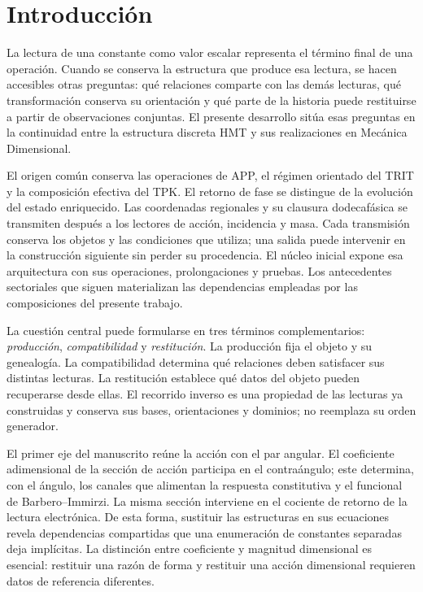 \section{Introducción}

\label{md:introduccion}
La lectura de una constante como valor escalar representa el término final
de una operación. Cuando se conserva la estructura que produce esa lectura,
se hacen accesibles otras preguntas: qué relaciones comparte con las demás
lecturas, qué transformación conserva su orientación y qué parte de la
historia puede restituirse a partir de observaciones conjuntas. El presente
desarrollo sitúa esas preguntas en la continuidad entre la estructura discreta
HMT y sus realizaciones en Mecánica Dimensional.

El origen común conserva las operaciones de APP, el régimen orientado del
TRIT y la composición efectiva del TPK. El retorno de fase se distingue de
la evolución del estado enriquecido. Las coordenadas regionales y su
clausura dodecafásica se transmiten después a los lectores de acción,
incidencia y masa. Cada transmisión conserva los objetos y las condiciones
que utiliza; una salida puede intervenir en la construcción siguiente sin
perder su procedencia. El núcleo inicial expone esa arquitectura con sus
operaciones, prolongaciones y pruebas. Los antecedentes sectoriales que
siguen materializan las dependencias empleadas por las composiciones del
presente trabajo.

La cuestión central puede formularse en tres términos complementarios:
\emph{producción}, \emph{compatibilidad} y \emph{restitución}. La
producción fija el objeto y su genealogía. La compatibilidad determina qué
relaciones deben satisfacer sus distintas lecturas. La restitución establece
qué datos del objeto pueden recuperarse desde ellas. El recorrido inverso
es una propiedad de las lecturas ya construidas y conserva sus bases,
orientaciones y dominios; no reemplaza su orden generador.

El primer eje del manuscrito reúne la acción con el par angular. El
coeficiente adimensional de la sección de acción participa en el
contraángulo; este determina, con el ángulo, los canales que alimentan la
respuesta constitutiva y el funcional de Barbero--Immirzi. La misma sección
interviene en el cociente de retorno de la lectura electrónica. De esta
forma, sustituir las estructuras en sus ecuaciones revela dependencias
compartidas que una enumeración de constantes separadas deja implícitas.
La distinción entre coeficiente y magnitud dimensional es esencial:
restituir una razón de forma y restituir una acción dimensional requieren
datos de referencia diferentes.


